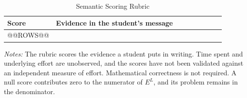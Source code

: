 \begin{table}[htbp]
\centering
\begingroup
{}
\small
\caption{Semantic Scoring Rubric}
\label{tab:llm-rubric}
\begin{tabular}{p{0.08\linewidth}p{0.81\linewidth}}
\toprule
Score & Evidence in the student's message \\
\midrule
@@ROWS@@
\bottomrule
\end{tabular}
\par\medskip
\begin{minipage}{\linewidth}
\footnotesize
\textit{Notes:} The rubric scores the evidence a student puts in writing. Time spent and underlying effort are unobserved, and the scores have not been validated against an independent measure of effort. Mathematical correctness is not required. A null score contributes zero to the numerator of $E^{L}$, and its problem remains in the denominator.
\end{minipage}
\endgroup
\end{table}
